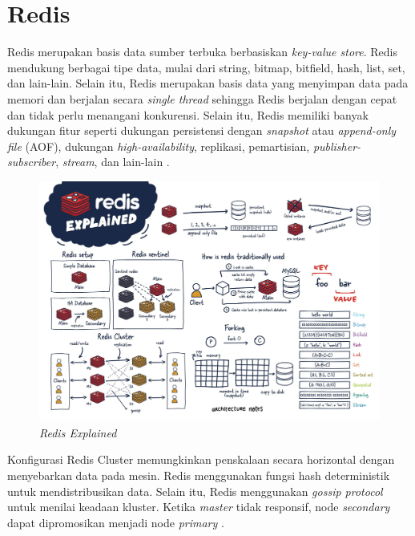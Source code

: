 \section{Redis}

Redis merupakan basis data sumber terbuka berbasiskan \textit{key-value store}. Redis mendukung berbagai tipe data, mulai dari string, bitmap, bitfield, hash, list, set, dan lain-lain. Selain itu, Redis merupakan basis data yang menyimpan data pada memori dan berjalan secara \textit{single thread} sehingga Redis berjalan dengan cepat dan tidak perlu menangani konkurensi. Selain itu, Redis memiliki banyak dukungan fitur seperti dukungan persistensi dengan \textit{snapshot} atau \textit{append-only file} (AOF), dukungan \textit{high-availability}, replikasi, pemartisian, \textit{publisher-subscriber}, \textit{stream}, dan lain-lain \parencite{redisExplained}.

\begin{figure}[htbp]
    \centering
    \includegraphics[width=1\textwidth]{resources/chapter-2/redis.jpg}
    \caption{\textit{Redis Explained \parencite{redisExplained}}}
    \label{fig:redis-explained}
\end{figure}

Konfigurasi Redis Cluster memungkinkan penskalaan secara horizontal dengan menyebarkan data pada mesin. Redis menggunakan fungsi hash deterministik untuk mendistribusikan data. Selain itu, Redis menggunakan \textit{gossip protocol} untuk menilai keadaan kluster. Ketika \textit{master} tidak responsif, node \textit{secondary} dapat dipromosikan menjadi node \textit{primary} \parencite{redisExplained}.

\pagebreak